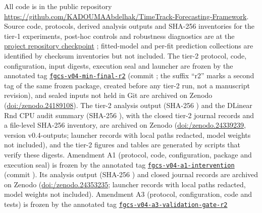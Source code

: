 \documentclass[5p,twocolumn]{elsarticle}
\begin{document}
All code is in the public repository \url{https://github.com/KADOUMAAbdelhak/TimeTrack-Forecasting-Framework}.
Source code, protocols, derived analysis outputs and SHA-256 inventories for
the tier-1 experiments, post-hoc controls and robustness diagnostics are at
the
\href{https://github.com/KADOUMAAbdelhak/TimeTrack-Forecasting-Framework/tree/0e8cad884896a706f62f0fae4ab2b52812f9b033}{project repository checkpoint}
\texttt{}; fitted-model and
per-fit prediction collections are identified by checksum inventories but not
included. The tier-2 protocol, code, configuration, input digests, execution
seal and launcher are frozen by the annotated tag
\href{https://github.com/KADOUMAAbdelhak/TimeTrack-Forecasting-Framework/tree/fgcs-v04-min-final-r2}{\texttt{fgcs-v04-min-final-r2}}
(commit \texttt{}; the suffix
``r2'' marks a second tag of the same frozen package, created before any tier-2
run, not a manuscript revision), and sealed inputs not held in Git are archived on Zenodo
(\href{https://doi.org/10.5281/zenodo.24189108}{doi:/\allowbreak zenodo.24189108}).
The tier-2 analysis output (SHA-256
\texttt{})
and the DLinear Rnd CPU audit summary (SHA-256
\texttt{}),
with the closed tier-2 journal records and a file-level SHA-256 inventory, are
archived on Zenodo
(\href{https://doi.org/10.5281/zenodo.24339239}{doi:/\allowbreak zenodo.24339239},
version v0.4-outputs; launcher records with local paths redacted, model
weights not included), and the tier-2 figures and tables are generated by
scripts that verify these digests. Amendment A1 (protocol, code,
configuration, package and execution seal) is frozen by the annotated tag
\href{https://github.com/KADOUMAAbdelhak/TimeTrack-Forecasting-Framework/tree/fgcs-v04-a1-intervention}{\texttt{fgcs-v04-a1-intervention}}
(commit \texttt{}). Its
analysis output (SHA-256
\texttt{})
and closed journal records are archived on Zenodo
(\href{https://doi.org/10.5281/zenodo.24353235}{doi:/\allowbreak zenodo.24353235};
launcher records with local paths redacted, model weights not included).
Amendment A3 (protocol, configuration, code and tests) is frozen by the
annotated tag
\href{https://github.com/KADOUMAAbdelhak/TimeTrack-Forecasting-Framework/tree/fgcs-v04-a3-validation-gate-r2}{\texttt{fgcs-v04-a3-validation-gate-r2}}
\end{document}
